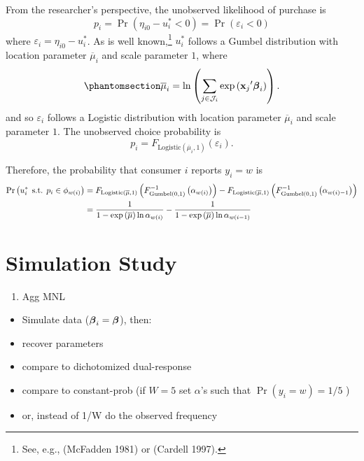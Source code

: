 \documentclass[
  letterpaper,
  DIV=11,
  numbers=noendperiod]{scrartcl}
\providecommand{\tightlist}{%
  \setlength{\itemsep}{0pt}\setlength{\parskip}{0pt}}\usepackage{longtable,booktabs,array}
\begin{document}
From the researcher's perspective, the unobserved likelihood of purchase
is \[
p_i = \Pr \left( \eta_{i0} - u_i^* < 0 \right) = \Pr \left( \varepsilon_i < 0 \right)
\] where \(\varepsilon_i = \eta_{i0} - u_i^*\). As is well
known,\footnote{See, e.g., (McFadden 1981) or (Cardell 1997).} \(u_i^*\)
follows a Gumbel distribution with location parameter
\(\overline{\mu}_i\) and scale parameter \(1\), where
\begin{equation}\phantomsection\label{eq-max-mu}{
\overline{\mu}_i = \ln \left( \sum_{j\in\mathcal{J}_i} \exp \left( {\x_j}'\bfbeta_i \right) \right).
}\end{equation} and so \(\varepsilon_i\) follows a Logistic distribution
with location parameter \(\overline{\mu}_i\) and scale parameter \(1\).
The unobserved choice probability is \[
p_i = F_{\text{Logistic} \left( \overline{\mu}_i, 1 \right)} \left( \varepsilon_i \right).
\]

Therefore, the probability that consumer \(i\) reports \(y_i=w\) is \[
\begin{aligned}
    \Pr \left( u_i^* \hspace{1ex} \text{s.t.} \hspace{1ex} p_i \in \phi_{w\left(i\right)} \right) 
    &= F_{\text{Logistic} \left( \overline{\mu}, 1 \right) } \left( F^{-1}_{\text{Gumbel} \left( 0, 1 \right) } \left( \alpha_{w\left(i\right)} \right) \right) - 
       F_{\text{Logistic} \left( \overline{\mu}, 1 \right) } \left( F^{-1}_{\text{Gumbel} \left( 0, 1 \right) } \left( \alpha_{w\left(i\right)-1} \right) \right) \\
    &= \frac{1}{1 - \exp \left( \overline{\mu} \right) \ln \alpha_{w\left(i\right)}} - 
       \frac{1}{1 - \exp \left( \overline{\mu} \right) \ln \alpha_{w\left(i-1\right)}} 
\end{aligned}
\]

\section{Simulation Study}\label{sec-simstudy}

\begin{enumerate}
\def\labelenumi{\arabic{enumi}.}
\tightlist
\item
  Agg MNL
\end{enumerate}

\begin{itemize}
\tightlist
\item
  Simulate data (\(\boldsymbol{\beta}_i = \boldsymbol{\beta}\)), then:
\item
  recover parameters
\item
  compare to dichotomized dual-response
\item
  compare to constant-prob (if \(W=5\) set \(\alpha\)'s such that
  \(\Pr(y_i=w) = 1/5\) )
\item
  or, instead of 1/W do the observed frequency
\end{itemize}
\end{document}
